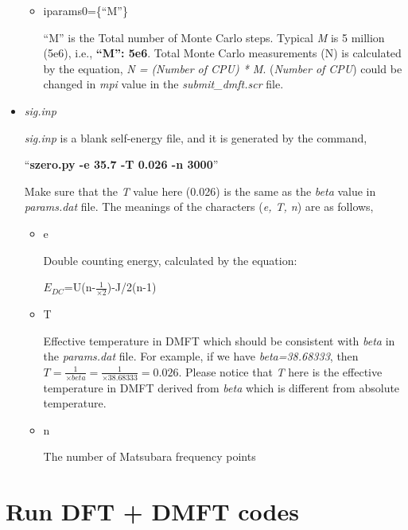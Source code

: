 \documentclass[12 pt]{article}
\begin{document}
\begin{itemize}
\begin{itemize}
	      \item iparams0=\{``M''\}

  ``M'' is the Total number of Monte Carlo steps. Typical \emph{M} is 5 million (5e6), i.e., \textbf{``M'': 5e6}. 
Total Monte Carlo measurements (N) is calculated by the equation, \emph{N = (Number of CPU) * M}. (\emph{Number of 
CPU}) could be changed in \emph{mpi} value in the \emph{submit\_dmft.scr} file.

	      \end{itemize}

	    \item \emph{sig.inp}

  \emph{sig.inp} is a blank self-energy file, and it is generated by the command,

  ``\textbf{szero.py -e 35.7 -T 0.026 -n 3000}''

  Make sure that the \emph{T} value here (0.026) is the same as the \emph{beta} value in \emph{params.dat} file. The 
meanings of the characters (\emph{e, T, n}) are as follows,

	      \begin{itemize}

	      \item e

  Double counting energy, calculated by the equation:

  $E_{DC}$=U(n-$\frac{1}{×2}$)-J/2(n-1)

	      \item T

  Effective temperature in DMFT which should be consistent with \emph{beta} in the \emph{params.dat} file. For 
example, if we have \emph{beta=38.68333}, then $T=\frac{1}{×beta}=\frac{1}{×38.68333}=0.026$. Please notice that 
\emph{T} here is the effective temperature in DMFT derived from \emph{beta} which is different from absolute 
temperature. 

	      \item n

  The number of Matsubara frequency points

	      \end{itemize}


	  \end{itemize}

  \cleardoublepage

    \section{Run DFT + DMFT codes}
\end{document}
